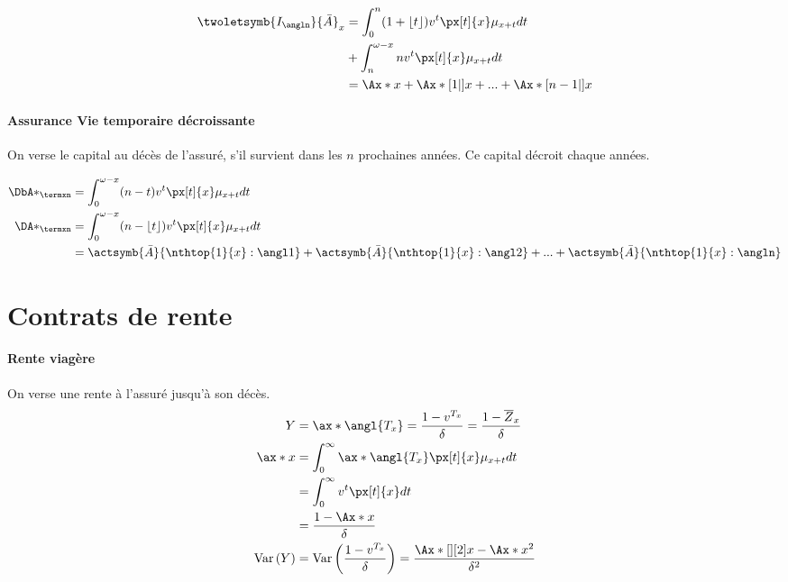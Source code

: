 \documentclass[10pt, french]{article}
\begin{document}
\begin{multicols*}{3}
\begin{align*}
	\twoletsymb{I_{\angln}}{\bar{A}}_{x}  &= \int_0^n (1 + \lfloor t \rfloor) v^t \px[t]{x} \mu_{x+t} dt \\
	& + \int_n^{\omega - x} n v^t \px[t]{x} \mu_{x+t} dt \\
		&= \Ax*{x} + \Ax*[1|]{x} + ... + \Ax*[n-1|]{x}
\end{align*}

\paragraph{Assurance Vie temporaire décroissante} On verse le capital au décès de l'assuré, s'il survient dans les $n$ prochaines années. Ce capital décroit chaque années.

\begin{align*}
	\DbA*_{\termxn} &= \int_0^{\omega - x} (n - t) v^t \px[t]{x} \mu_{x+t} dt \\
	\DA*_{\termxn}  &= \int_0^{\omega - x} (n - \lfloor t \rfloor) v^t \px[t]{x} \mu_{x+t} dt \\
		&= \actsymb{\bar{A}}{\nthtop{1}{x}:\angl1} + \actsymb{\bar{A}}{\nthtop{1}{x}:\angl2} + ... + \actsymb{\bar{A}}{\nthtop{1}{x}:\angln}
\end{align*}

\section{Contrats de rente}
\paragraph{Rente viagère} On verse une rente à l'assuré jusqu'à son décès. 
\begin{align*}
Y	&  = \ax*{\angl{T_{x}}} = \frac{1-v^{T_x}}{\delta} = \frac{1 -\overline{Z}_x}{\delta} \\
\ax*{x} & = \int_{0}^{\infty}  \ax*{\angl{T_{x}}}  \px[t]{x} \mu_{x+t} dt \\
	& = \int_{0}^{\infty} v^t \px[t]{x} dt \\
	& = \frac{1 - \Ax*{x}}{\delta} \\
\variance{Y}	& = \variance{\frac{1- v^{T_x}}{\delta}} =  \frac{\Ax*[][2]{x} - \Ax*{x}^2}{\delta^2} \\
\end{align*}


\end{multicols*}
\end{document}
